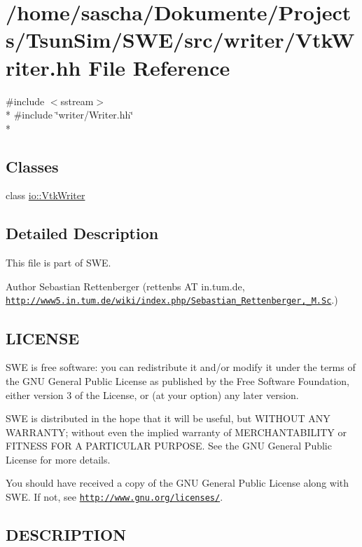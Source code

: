 \hypertarget{VtkWriter_8hh}{\section{/home/sascha/\-Dokumente/\-Projects/\-Tsun\-Sim/\-S\-W\-E/src/writer/\-Vtk\-Writer.hh File Reference}
\label{VtkWriter_8hh}
}
{\ttfamily \#include $<$sstream$>$}\\*
{\ttfamily \#include \char`\"{}writer/\-Writer.\-hh\char`\"{}}\\*
\subsection*{Classes}
\begin{DoxyCompactItemize}
\item 
class \hyperlink{classio_1_1VtkWriter}{io\-::\-Vtk\-Writer}
\end{DoxyCompactItemize}


\subsection{Detailed Description}
This file is part of S\-W\-E.

\begin{DoxyAuthor}{Author}
Sebastian Rettenberger (rettenbs A\-T in.\-tum.\-de, \href{http://www5.in.tum.de/wiki/index.php/Sebastian_Rettenberger,_M.Sc}{\tt http\-://www5.\-in.\-tum.\-de/wiki/index.\-php/\-Sebastian\-\_\-\-Rettenberger,\-\_\-\-M.\-Sc}.)
\end{DoxyAuthor}
\hypertarget{Writer_8hh_LICENSE}{}\subsection{L\-I\-C\-E\-N\-S\-E}\label{Writer_8hh_LICENSE}
S\-W\-E is free software\-: you can redistribute it and/or modify it under the terms of the G\-N\-U General Public License as published by the Free Software Foundation, either version 3 of the License, or (at your option) any later version.

S\-W\-E is distributed in the hope that it will be useful, but W\-I\-T\-H\-O\-U\-T A\-N\-Y W\-A\-R\-R\-A\-N\-T\-Y; without even the implied warranty of M\-E\-R\-C\-H\-A\-N\-T\-A\-B\-I\-L\-I\-T\-Y or F\-I\-T\-N\-E\-S\-S F\-O\-R A P\-A\-R\-T\-I\-C\-U\-L\-A\-R P\-U\-R\-P\-O\-S\-E. See the G\-N\-U General Public License for more details.

You should have received a copy of the G\-N\-U General Public License along with S\-W\-E. If not, see \href{http://www.gnu.org/licenses/}{\tt http\-://www.\-gnu.\-org/licenses/}.\hypertarget{NetCdfWriter_8hh_DESCRIPTION}{}\subsection{D\-E\-S\-C\-R\-I\-P\-T\-I\-O\-N}\label{NetCdfWriter_8hh_DESCRIPTION}
